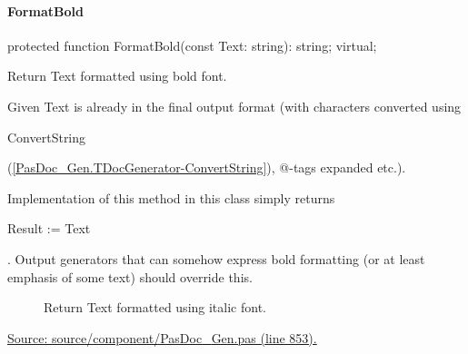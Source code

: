 \documentclass{report}
\newif\ifpdf
\begin{document}
\paragraph*{FormatBold}\hspace*{\fill}

\label{PasDoc_Gen.TDocGenerator-FormatBold}
\begin{list}{}{
\setlength{\itemindent}{0cm}
\setlength{\listparindent}{0cm}
\setlength{\leftmargin}{\evensidemargin}
\addtolength{\leftmargin}{\tmplength}
\settowidth{\labelsep}{X}
\addtolength{\leftmargin}{\labelsep}
\setlength{\labelwidth}{\tmplength}
}
\item[\textbf{Declaration}\hfill]
\ifpdf
\begin{flushleft}
\fi
\begin{ttfamily}
protected function FormatBold(const Text: string): string; virtual;\end{ttfamily}

\ifpdf
\end{flushleft}
\fi

\par
\item[\textbf{Description}]
Return Text formatted using bold font.

Given Text is already in the final output format (with characters converted using \begin{ttfamily}ConvertString\end{ttfamily}(\ref{PasDoc_Gen.TDocGenerator-ConvertString}), @{-}tags expanded etc.).

Implementation of this method in this class simply returns \begin{ttfamily}Result := Text\end{ttfamily}. Output generators that can somehow express bold formatting (or at least emphasis of some text) should override this.

\item[\textbf{See also}]
\begin{description}
\item[\begin{ttfamily}FormatItalic\end{ttfamily}(\ref{PasDoc_Gen.TDocGenerator-FormatItalic})] 
Return Text formatted using italic font.
\end{description}
\par
\href{https://github.com/pasdoc/pasdoc/blob/master/source/component/PasDoc_Gen.pas#L853}{Source: source/component/PasDoc{\_}Gen.pas (line 853).}

\end{list}
\end{document}
